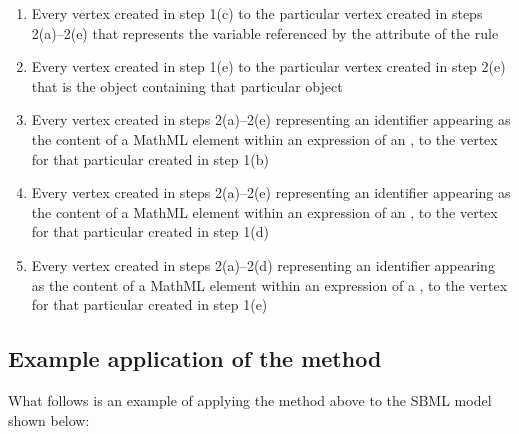 \begin{enumerate}
\begin{enumerate}
  \item Every vertex created in step 1(c) to the particular vertex
    created in steps 2(a)--2(e) that represents the variable
    referenced by the  attribute of the rule
    
  \item Every vertex created in step 1(e) to the particular vertex
    created in step 2(e) that is the \Reaction object containing
    that particular \KineticLaw object
    
  \item Every vertex created in steps 2(a)--2(e) representing an
    identifier appearing as the content of a MathML 
    element within an expression of an \AssignmentRule, to the
    vertex for that particular \AssignmentRule created in step 1(b)
    
  \item Every vertex created in steps 2(a)--2(e) representing an
    identifier appearing as the content of a MathML 
    element within an expression of an \AlgebraicRule, to the
    vertex for that particular \AlgebraicRule created in step 1(d)
    
  \item Every vertex created in steps 2(a)--2(d) representing an
    identifier appearing as the content of a MathML 
    element within an expression of a \KineticLaw, to the vertex
    for that particular \KineticLaw created in step 1(e)

  \end{enumerate}

\end{enumerate}


\subsection*{Example application of the method}

What follows is an example of applying the method above to the
SBML model shown below:


